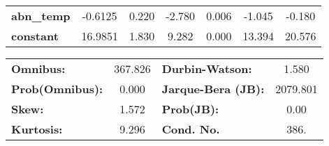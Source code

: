\begin{center}
\begin{tabular}{lcccccc}
\textbf{abn\_temp}       &      -0.6125  &        0.220     &    -2.780  &         0.006        &       -1.045    &       -0.180     \\
\textbf{constant}        &      16.9851  &        1.830     &     9.282  &         0.000        &       13.394    &       20.576     \\
\bottomrule
\end{tabular}
\end{center}\begin{center}
\begin{tabular}{lclc}
\toprule
\textbf{Omnibus:}       & 367.826 & \textbf{  Durbin-Watson:     } &    1.580  \\
\textbf{Prob(Omnibus):} &   0.000 & \textbf{  Jarque-Bera (JB):  } & 2079.801  \\
\textbf{Skew:}          &   1.572 & \textbf{  Prob(JB):          } &     0.00  \\
\textbf{Kurtosis:}      &   9.296 & \textbf{  Cond. No.          } &     386.  \\
\bottomrule
\end{tabular}
\end{center}